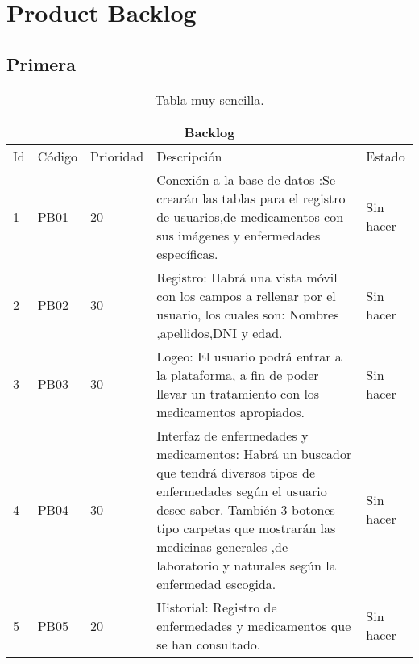 \chapter{Product Backlog}

\section{Primera}

\begin{table}[htb]
	\centering
	\begin{tabular}{|l|p{2cm}|l|p{9cm}|l|}
		\hline
		\multicolumn{5}{|c|}{Backlog} \\ \hline
		Id & Código & Prioridad & Descripción & Estado \\
		\hline \hline
		1 & PB01 & 20 &  Conexión a la base de datos :Se crearán  las tablas para el registro de usuarios,de medicamentos con sus imágenes y enfermedades específicas. & Sin hacer \\ \hline
		2 & PB02 & 30 & Registro: Habrá una vista móvil con los campos a rellenar por el usuario, los cuales son: Nombres ,apellidos,DNI y edad. & Sin hacer \\ \hline
		3 & PB03 & 30 & Logeo: El usuario podrá entrar a la plataforma, a fin de poder llevar un tratamiento con los medicamentos apropiados. & Sin hacer \\ \hline
		
		4 & PB04 & 30 & Interfaz de enfermedades y medicamentos: Habrá un buscador que tendrá diversos tipos de enfermedades según el usuario desee saber. También 3 botones tipo carpetas que mostrarán las medicinas generales ,de laboratorio y naturales según la enfermedad escogida. & Sin hacer \\ \hline
		5 & PB05 & 20 & Historial: Registro de enfermedades y medicamentos que se han consultado. & Sin hacer \\ \hline
	\end{tabular}
	\caption{Tabla muy sencilla.}
	\label{tabla:Backlog}
\end{table}
